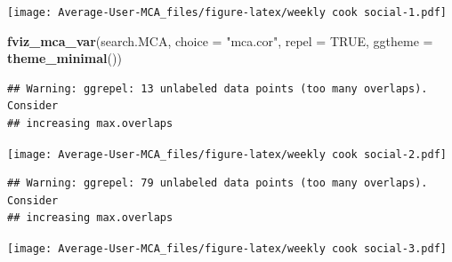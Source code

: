 \documentclass[
]{article}
\newenvironment{Shaded}{\begin{snugshade}}{\end{snugshade}}
\newcommand{\DataTypeTok}[1]{\textcolor[rgb]{0.13,0.29,0.53}{#1}}
\newcommand{\KeywordTok}[1]{\textcolor[rgb]{0.13,0.29,0.53}{\textbf{#1}}}
\newcommand{\NormalTok}[1]{#1}
\newcommand{\OtherTok}[1]{\textcolor[rgb]{0.56,0.35,0.01}{#1}}
\newcommand{\StringTok}[1]{\textcolor[rgb]{0.31,0.60,0.02}{#1}}
\begin{document}
\texttt{[image: Average-User-MCA\_files/figure-latex/weekly cook social-1.pdf]}

\begin{Shaded}
\begin{Highlighting}[]
\KeywordTok{fviz_mca_var}\NormalTok{(search.MCA, }\DataTypeTok{choice =} \StringTok{"mca.cor"}\NormalTok{, }\DataTypeTok{repel =} \OtherTok{TRUE}\NormalTok{,}
             \DataTypeTok{ggtheme =} \KeywordTok{theme_minimal}\NormalTok{())}
\end{Highlighting}
\end{Shaded}

\begin{verbatim}
## Warning: ggrepel: 13 unlabeled data points (too many overlaps). Consider
## increasing max.overlaps
\end{verbatim}

\texttt{[image: Average-User-MCA\_files/figure-latex/weekly cook social-2.pdf]}

\begin{Shaded}
\end{Shaded}

\begin{verbatim}
## Warning: ggrepel: 79 unlabeled data points (too many overlaps). Consider
## increasing max.overlaps
\end{verbatim}

\texttt{[image: Average-User-MCA\_files/figure-latex/weekly cook social-3.pdf]}
\end{document}
